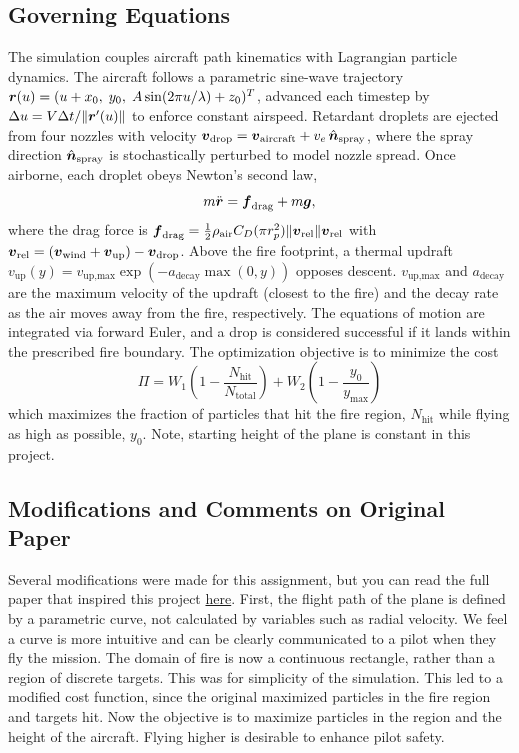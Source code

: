 \documentclass{article}
\begin{document}
\subsection*{Governing Equations}
The simulation couples aircraft path kinematics with Lagrangian particle dynamics. The aircraft follows a parametric sine-wave trajectory $\mbox{\boldmath $r$}(u) = (u + x_0,\; y_0,\; A\sin(2\pi u/\lambda) + z_0)^T$, advanced each timestep by $\Delta u = V\Delta t / \|\mbox{\boldmath $r$}'(u)\|$ to enforce constant airspeed. Retardant droplets are ejected from four nozzles with velocity $\mbox{\boldmath $v$}_\text{drop} = \mbox{\boldmath $v$}_\text{aircraft} + v_e\,\hat{\mbox{\boldmath $n$}}_\text{spray}$, where the spray direction $\hat{\mbox{\boldmath $n$}}_\text{spray}$ is stochastically perturbed to model nozzle spread. Once airborne, each droplet obeys Newton's second law,
\begin{equation}
    m\ddot{\mbox{\boldmath $r$}} = \mbox{\boldmath $f$}_\text{drag} + m\mbox{\boldmath $g$},
\end{equation}
where the drag force is $\mbox{\boldmath $f$}_\text{drag} = \frac{1}{2}\rho_\text{air} C_D (\pi r_p^2)\|\mbox{\boldmath $v$}_\text{rel}\|\mbox{\boldmath $v$}_\text{rel}$ with $\mbox{\boldmath $v$}_\text{rel} = (\mbox{\boldmath $v$}_\text{wind} + \mbox{\boldmath $v$}_\text{up}) - \mbox{\boldmath $v$}_\text{drop}$. Above the fire footprint, a thermal updraft $v_\text{up}(y) = v_{\text{up,max}}\exp(-a_{\text{decay}}\max(0,y))$ opposes descent. $v_{\text{up,max}}$ and $a_{\text{decay}}$ are the maximum velocity of the updraft (closest to the fire) and the decay rate as the air moves away from the fire, respectively. The equations of motion are integrated via forward Euler, and a drop is considered successful if it lands within the prescribed fire boundary. The optimization objective is to minimize the cost 
\begin{equation}
    \Pi = W_1\left(1 - \frac{N_\text{hit}}{N_\text{total}} \right) + W_2\left(1 - \frac{y_0}{y_{\text{max}}} \right)
\end{equation}
which maximizes the fraction of particles that hit the fire region, $N_{\text{hit}}$ while flying as high as possible, $y_0$. Note, starting height of the plane is constant in this project.



\subsection*{Modifications and Comments on Original Paper}
Several modifications were made for this assignment, but you can read the full paper that inspired this project \href{https://msol.berkeley.edu/wp-content/uploads/2023/10/181.pdf}{here}. First, the flight path of the plane is defined by a parametric curve, not calculated by variables such as radial velocity. We feel a curve is more intuitive and can be clearly communicated to a pilot when they fly the mission. The domain of fire is now a continuous rectangle, rather than a region of discrete targets. This was for simplicity of the simulation. This led to a modified cost function, since the original maximized particles in the fire region and targets hit. Now the objective is to maximize particles in the region and the height of the aircraft. Flying higher is desirable to enhance pilot safety. 
\end{document}
